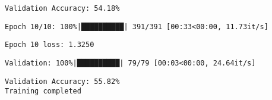 \documentclass[
  letterpaper,
  DIV=11,
  numbers=noendperiod]{scrreprt}
\begin{document}
\begin{verbatim}
Validation Accuracy: 54.18%
\end{verbatim}

\begin{verbatim}
Epoch 10/10: 100%|██████████| 391/391 [00:33<00:00, 11.73it/s]
\end{verbatim}

\begin{verbatim}
Epoch 10 loss: 1.3250
\end{verbatim}

\begin{verbatim}
Validation: 100%|██████████| 79/79 [00:03<00:00, 24.64it/s]
\end{verbatim}

\begin{verbatim}
Validation Accuracy: 55.82%
Training completed
\end{verbatim}

\begin{verbatim}
\end{verbatim}
\end{document}
